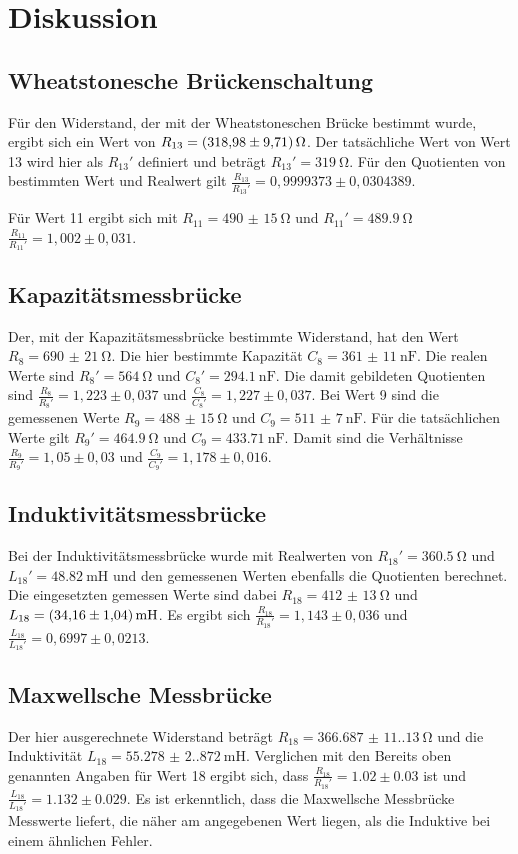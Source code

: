 \section{Diskussion}
    \subsection{Wheatstonesche Brückenschaltung}
    Für den Widerstand, der mit der Wheatstoneschen Brücke bestimmt wurde, ergibt sich ein Wert von $R_{13}=\qty{318,98(9,71)}{\ohm}$.
    Der tatsächliche Wert von Wert 13 wird hier als $R_{13}'$ definiert und beträgt $R_{13}'=\qty{319}{\ohm}$.
    Für den Quotienten von bestimmten Wert und Realwert gilt $\frac{R_{13}}{R_{13}'}=0,9999373\pm0,0304389$.

    \noindent Für Wert 11 ergibt sich mit $R_{11}=\qty{490(15)}{\ohm}$ und $R_{11}'=\qty{489,9}{\ohm}$ $\frac{R_{11}}{R_11'}=1,002\pm0,031$.

    \subsection{Kapazitätsmessbrücke}
    Der, mit der Kapazitätsmessbrücke bestimmte Widerstand, hat den Wert $R_8=\qty{690(21)}{\ohm}$.
    Die hier bestimmte Kapazität $C_8=\qty{361(11)}{\nano\farad}$. 
    Die realen Werte sind $R_8'=\qty{564}{\ohm}$ und $C_8'=\qty{294,1}{\nano\farad}$.
    Die damit gebildeten Quotienten sind $\frac{R_8}{R_8'}=1,223\pm0,037$ und $\frac{C_8}{C_8'}=1,227\pm0,037$.
    Bei Wert 9 sind die gemessenen Werte $R_9=\qty{488(15)}{\ohm}$ und $C_9=\qty{511(7)}{\nano\farad}$.
    Für die tatsächlichen Werte gilt $R_9'=\qty{464,9}{\ohm}$ und $C_9=\qty{433,71}{\nano\farad}$.
    Damit sind die Verhältnisse $\frac{R_9}{R_9'}=1,05\pm0,03$ und $\frac{C_9}{C_9'}=1,178\pm0,016$.
    
    \subsection{Induktivitätsmessbrücke}
    Bei der Induktivitätsmessbrücke wurde mit Realwerten von $R_{18}'=\qty{360,5}{\ohm}$ und $L_{18}'=\qty{48,82}{\milli\henry}$ und den gemessenen Werten ebenfalls die Quotienten berechnet.
    Die eingesetzten gemessen Werte sind dabei $R_{18}=\qty{412(13)}{\ohm}$ und $L_{18}=\qty{34,16(1,04)}{\milli\henry}$.
    Es ergibt sich $\frac{R_{18}}{R_{18}'}=1,143\pm0,036$ und $\frac{L_{18}}{L_{18}'}=0,6997\pm0,0213$.

    \subsection{Maxwellsche Messbrücke}
    Der hier ausgerechnete Widerstand beträgt $R_18=\qty{366.687(11.130)}{\ohm}$ und die Induktivität $L_18=\qty{55.278(2.872)}{\milli\henry}$.
    Verglichen mit den Bereits oben genannten Angaben für Wert 18 ergibt sich, dass $\frac{R_{18}}{R_{18}'}=1.02\pm0.03$ ist und
    $\frac{L_{18}}{L_{18}'}=1.132\pm0.029$. Es ist erkenntlich, dass die Maxwellsche Messbrücke Messwerte liefert, die näher am angegebenen
    Wert liegen, als die Induktive bei einem ähnlichen Fehler.

